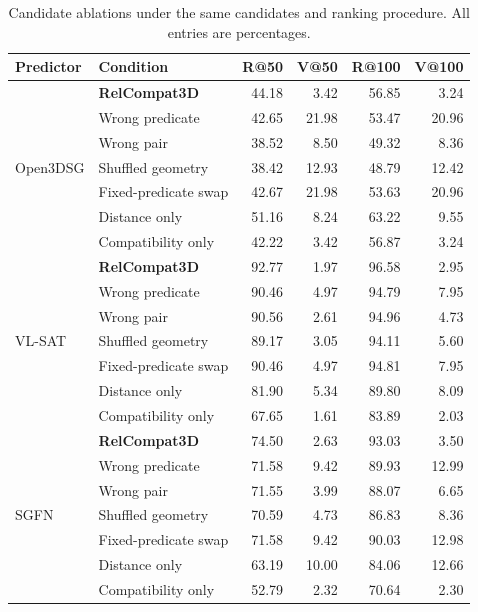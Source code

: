 \begin{table}[t]
\centering\small
\setlength{\tabcolsep}{1.5pt}
\begin{tabular}{@{}llrrrr@{}}
\toprule
Predictor & Condition & R@50 & V@50 & R@100 & V@100 \\
\midrule
\multirow{7}{*}{Open3DSG}
& \textbf{RelCompat3D} & 44.18 & 3.42 & 56.85 & 3.24 \\
& Wrong predicate & 42.65 & 21.98 & 53.47 & 20.96 \\
& Wrong pair & 38.52 & 8.50 & 49.32 & 8.36 \\
& Shuffled geometry & 38.42 & 12.93 & 48.79 & 12.42 \\
& Fixed-predicate swap & 42.67 & 21.98 & 53.63 & 20.96 \\
& Distance only & 51.16 & 8.24 & 63.22 & 9.55 \\
& Compatibility only & 42.22 & 3.42 & 56.87 & 3.24 \\
\midrule
\multirow{7}{*}{VL-SAT}
& \textbf{RelCompat3D} & 92.77 & 1.97 & 96.58 & 2.95 \\
& Wrong predicate & 90.46 & 4.97 & 94.79 & 7.95 \\
& Wrong pair & 90.56 & 2.61 & 94.96 & 4.73 \\
& Shuffled geometry & 89.17 & 3.05 & 94.11 & 5.60 \\
& Fixed-predicate swap & 90.46 & 4.97 & 94.81 & 7.95 \\
& Distance only & 81.90 & 5.34 & 89.80 & 8.09 \\
& Compatibility only & 67.65 & 1.61 & 83.89 & 2.03 \\
\midrule
\multirow{7}{*}{SGFN}
& \textbf{RelCompat3D} & 74.50 & 2.63 & 93.03 & 3.50 \\
& Wrong predicate & 71.58 & 9.42 & 89.93 & 12.99 \\
& Wrong pair & 71.55 & 3.99 & 88.07 & 6.65 \\
& Shuffled geometry & 70.59 & 4.73 & 86.83 & 8.36 \\
& Fixed-predicate swap & 71.58 & 9.42 & 90.03 & 12.98 \\
& Distance only & 63.19 & 10.00 & 84.06 & 12.66 \\
& Compatibility only & 52.79 & 2.32 & 70.64 & 2.30 \\
\bottomrule
\end{tabular}
\caption{Candidate ablations under the same candidates and ranking procedure. All entries are percentages.}
\label{tab:no-family-ablation}
\end{table}
